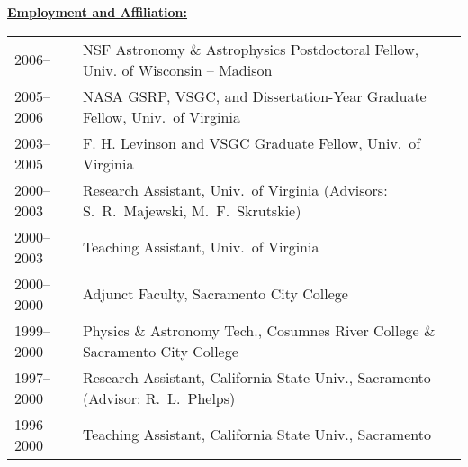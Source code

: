 \documentclass[12pt]{article}
\begin{document}
\noindent \underline{\bf Employment and Affiliation:}\\
\noindent \begin{tabular}{ll}

2006--      &NSF Astronomy \& Astrophysics Postdoctoral Fellow, Univ. of Wisconsin -- Madison\\ 
2005--2006 &NASA GSRP, VSGC, and Dissertation-Year Graduate Fellow, Univ.\ of Virginia \\
2003--2005 &F. H. Levinson and VSGC Graduate Fellow, Univ.\ of Virginia \\
2000--2003 &Research Assistant, Univ.\ of Virginia (Advisors: S.~R.\ Majewski, M.~F.\ Skrutskie) \\
2000--2003 &Teaching Assistant, Univ.\ of Virginia \\
2000--2000 &Adjunct Faculty, Sacramento City College \\
1999--2000 &Physics \& Astronomy Tech., Cosumnes River College \& Sacramento City College\\
1997--2000 &Research Assistant, California State Univ., Sacramento (Advisor: R.~L.\ Phelps) \\
1996--2000 &Teaching Assistant, California State Univ., Sacramento  \\

\end{tabular}
\end{document}
